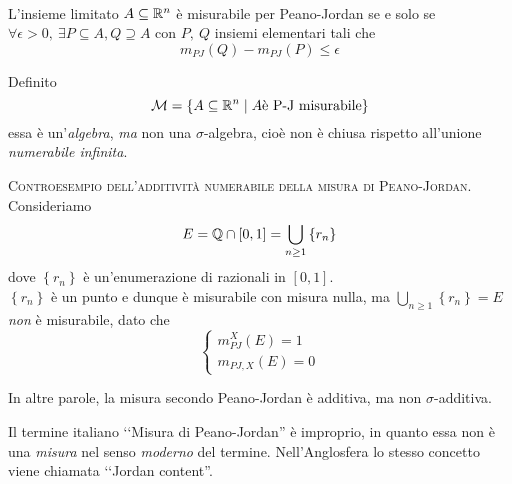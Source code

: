 	\begin{proposition}~{}\\
		L'insieme limitato $A\subseteq \mathbb{R}^n$ è misurabile per Peano-Jordan se e solo se $\forall \epsilon>0,\ \exists P\subseteq A, Q\supseteq A$ con $P,\ Q$ insiemi elementari tali che
		\begin{equation}
			m_{PJ}\left(Q\right)-m_{PJ}\left(P\right)\leq \epsilon
		\end{equation}
	\end{proposition}
	Definito
	\begin{equation}
		\mathcal{M}=\left\{A\subseteq \mathbb{R}^n\mid A\text{è P-J misurabile}\right\}
	\end{equation}
	essa è un'\textit{algebra}, \textit{ma} non una $\sigma$-algebra, cioè non è chiusa rispetto all'unione \textit{numerabile infinita}.
	\begin{example}\textsc{Controesempio dell'additività numerabile della misura di Peano-Jordan.}\\
		Consideriamo
		\begin{equation*}
			E=\mathbb{Q}\cap\left[0,1\right]=\bigcup_{n\geq 1}\left\{r_n\right\}
		\end{equation*}
		dove $\left\{r_n\right\}$ è un'enumerazione di razionali in $\left[0,1\right]$.\\
		$\left\{r_n\right\}$ è un punto e dunque è misurabile con misura nulla, ma $\displaystyle\bigcup_{n\geq 1}\left\{r_n\right\}=E$ \textit{non} è misurabile, dato che
		\begin{equation*}
			\begin{cases}
				m_{PJ}^X\left(E\right)=1\\
				m_{PJ,X}\left(E\right)=0
			\end{cases}
		\end{equation*}
	\end{example}
	In altre parole, la misura secondo Peano-Jordan è additiva, ma non $\sigma$-additiva.
	\begin{digression}
		Il termine italiano ‘‘Misura di Peano-Jordan'' è improprio, in quanto essa non è una \textit{misura} nel senso \textit{moderno} del termine. Nell'Anglosfera lo stesso concetto viene chiamata ‘‘Jordan content''.
	\end{digression}
